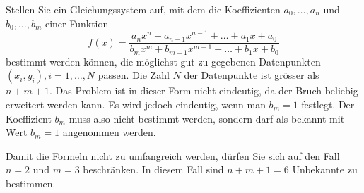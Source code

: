 Stellen Sie ein Gleichungssystem auf, mit dem die Koeffizienten
$a_0,\dots,a_n$ und $b_0,\dots,b_m$ einer Funktion
\[
f(x)
=
\frac{
a_nx^n+a_{n-1}x^{n-1}+\dots+a_1x+a_0
}{
b_mx^m+b_{m-1}x^{m-1}+\dots+b_1x+b_0
}
\]
bestimmt werden können, die möglichst gut zu gegebenen Datenpunkten
$(x_i,y_i), i=1,\dots,N$ passen.
Die Zahl $N$ der Datenpunkte ist grösser als $n+m+1$.
Das Problem ist in dieser Form nicht eindeutig, da der Bruch beliebig
erweitert werden kann.
Es wird jedoch eindeutig, wenn man $b_m=1$ festlegt.
Der Koeffizient $b_m$ muss also nicht bestimmt werden, sondern darf
als bekannt mit Wert $b_m=1$ angenommen werden.

\begin{hinweis}
Damit die Formeln nicht zu umfangreich werden, dürfen Sie sich auf den Fall
$n=2$ und $m=3$ beschränken.
In diesem Fall sind $n+m+1=6$ Unbekannte zu bestimmen.
\end{hinweis}

